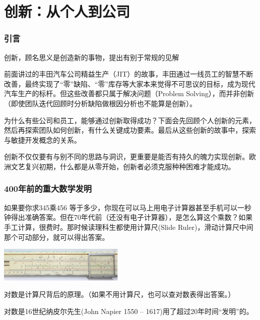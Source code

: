 \chapter{创新：从个人到公司} %

\hypertarget{ux5f15ux8a00}{%
\subsection{引言}\label{ux5f15ux8a00}}

创新，顾名思义是创造新的事物，提出有别于常规的见解

前面讲过的丰田汽车公司精益生产（JIT）的故事，丰田通过一线员工的智慧不断改善，最终实现了“零”缺陷、“零”库存等大家本来觉得不可思议的目标，成为现代汽车生产的标杆。但这些改善都只属于解决问题（Problem Solving），而并非创新（即使团队迭代回顾时分析缺陷做根因分析也不能算是创新）。

为什么有些公司和员工，能够通过创新取得成功？下面会先回顾个人创新的元素，然后再探索团队如何创新，有什么关键成功要素。最后从这些创新的故事中，探索与敏捷开发概念的关系。

创新不仅仅要有与别不同的思路与洞识，更重要是能否有持久的魄力实现创新。欧洲文艺复兴初期，什么都是从零开始，创新者必须克服种种困难才能成功。

\hypertarget{ux5e74ux524dux7684ux91cdux5927ux6570ux5b66ux53d1ux660e}{%
\subsection{400年前的重大数学发明}\label{ux5e74ux524dux7684ux91cdux5927ux6570ux5b66ux53d1ux660e}}

如果要你求345乘456
等于多少，你现在可以马上用电子计算器甚至手机可以一秒钟得出准确答案。但在70年代前（还没有电子计算器），是怎么算这个乘数？如果手工计算，很费时。那时候读理科生都使用计算尺(Slide
Ruler)，滑动计算尺中间那个可动部分，就可以得出答案。


\includegraphics[width=6cm]{SlideRulerScreenshot_2023-12-06_194105.jpg}

对数是计算尺背后的原理。（如果不用计算尺，也可以查对数表得出答案。）

对数是16世纪纳皮尔先生(John Napier 1550 --
1617)用了超过20年时间“发明”的。

